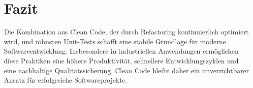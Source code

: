 \documentclass[conference]{IEEEtran}
\begin{document}
\section{Fazit}

Die Kombination aus Clean Code, der durch Refactoring kontinuierlich optimiert wird, und robusten Unit-Tests schafft eine stabile Grundlage für moderne Softwareentwicklung. Insbesondere in industriellen Anwendungen ermöglichen diese Praktiken eine höhere Produktivität, schnellere Entwicklungszyklen und eine nachhaltige Qualitätssicherung. Clean Code bleibt daher ein unverzichtbarer Ansatz für erfolgreiche Softwareprojekte.
\printbibliography
\end{document}
